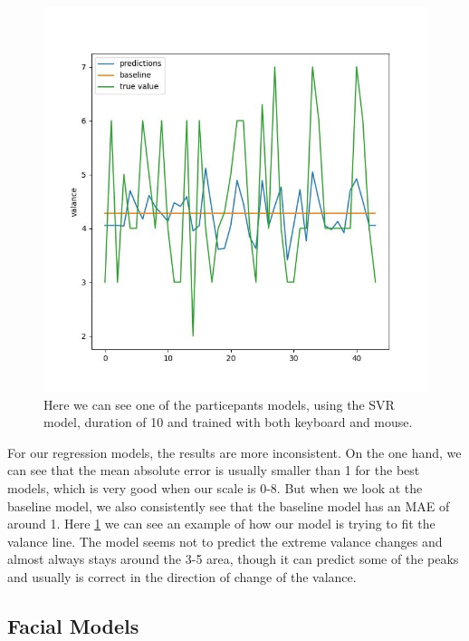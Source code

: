     \begin{figure}
        \centering
        \includegraphics[width=14cm]{figures/results/reg_fit}   
        \caption{Here we can see one of the particepants models, using the SVR model, duration of 10 and trained with both keyboard and mouse.}
        \label{fig:reg_fit} 
    \end{figure}

    For our regression models, the results are more inconsistent. On the one hand, we can see that the mean absolute error is usually 
    smaller than 1 for the best models, which is very good when our scale is 0-8. But when we look at the baseline model, 
    we also consistently see that the baseline model has an MAE of around 1. Here \ref{fig:reg_fit} we can see an example of 
    how our model is trying to fit the valance line. The model seems not to predict the extreme valance changes and almost always 
    stays around the 3-5 area, though it can predict some of the peaks and usually is correct in the direction of change of the valance.

    \newpage

    \subsection{Facial Models}

